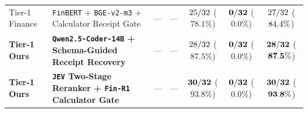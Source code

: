 \begin{table}[t]
\begin{tabular}{@{}llccccc@{}}
Tier-1 Finance & \texttt{FinBERT} + \texttt{BGE-v2-m3} + Calculator Receipt Gate & --- & --- & $25/32$ ($78.1\%$) & $\mathbf{0/32}$ ($\mathbf{0.0\%}$) & $27/32$ ($84.4\%$) \\
\textbf{Tier-1 Ours} & \textbf{\texttt{Qwen2.5-Coder-14B} + Schema-Guided Receipt Recovery} & --- & --- & $28/32$ ($87.5\%$) & $\mathbf{0/32}$ ($\mathbf{0.0\%}$) & $\mathbf{28/32}$ ($\mathbf{87.5\%}$) \\
\textbf{Tier-1 Ours} & \textbf{\texttt{JEV} Two-Stage Reranker + \texttt{Fin-R1} Calculator Gate} & --- & --- & $\mathbf{30/32}$ ($\mathbf{93.8\%}$) & $\mathbf{0/32}$ ($\mathbf{0.0\%}$) & $\mathbf{30/32}$ ($\mathbf{93.8\%}$) \\
\bottomrule
\end{tabular}
\end{table}

